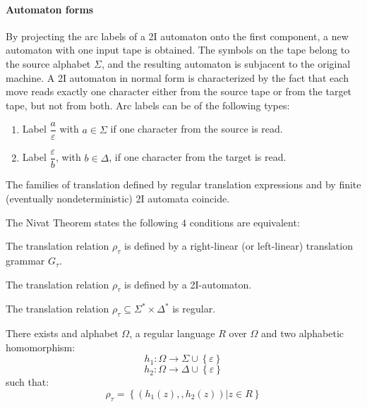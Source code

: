 \paragraph*{Automaton forms}
By projecting the arc labels of a 2I automaton onto the first component, a new automaton with one input tape is obtained.
The symbols on the tape belong to the source alphabet $\Sigma$, and the resulting automaton is subjacent to the original machine.
A 2I automaton in normal form is characterized by the fact that each move reads exactly one character either from the source tape or from the target tape, but not from both.
Arc labels can be of the following types:
\begin{enumerate}
    \item Label $\dfrac{a}{\varepsilon}$ with $a \in \Sigma$ if one character from the source is read.
    \item Label $\dfrac{\varepsilon}{b}$, with $b \in \Delta$, if one character from the target is read.
\end{enumerate}
The families of translation defined by regular translation expressions and by finite (eventually nondeterministic) 2I automata coincide.
\begin{theorem}
    The Nivat Theorem states the following $4$ conditions are equivalent:

    The translation relation $\rho_\tau$ is defined by a right-linear (or left-linear) translation grammar $G_\tau$.

    The translation relation $\rho_\tau$ is defined by a 2I-automaton.

    The translation relation $\rho_\tau \subseteq \Sigma^{*} \times \Delta^{*}$ is regular.

    There exists and alphabet $\Omega$, a regular language $R$ over $\Omega$ and two alphabetic homomorphism: 
    \[h_1 : \Omega \rightarrow \Sigma \cup \left\{ \varepsilon \right\}\]
    \[h_2 : \Omega \rightarrow \Delta \cup \left\{ \varepsilon \right\}\]
    such that:
    \[ \rho_\tau = \left\{ \left( h_1(z), , h_2(z) \right) | z \in R \right\} \]
\end{theorem}

